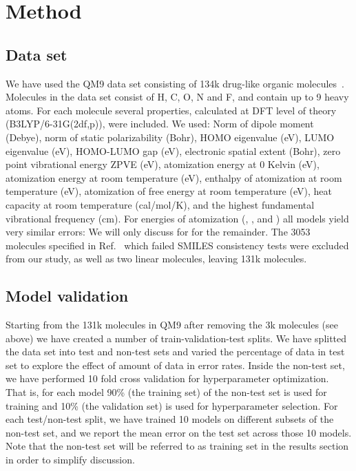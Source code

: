 \documentclass[reprint, superscriptaddress,
amsmath,amssymb, aps, prb,
]{revtex4-1}
\begin{document}
{\section{Method}
\subsection{Data set}

We have used the QM9 data set consisting of 134k drug-like organic molecules~\cite{gdb9}.
Molecules in the data set consist of H, C, O, N and F, and contain up to 9 heavy atoms. 
For each molecule several properties, calculated at DFT level of theory (B3LYP/6-31G(2df,p)), were included. 
We used: Norm of dipole moment  (Debye), norm of static polarizability  (Bohr), HOMO eigenvalue  (eV), LUMO eigenvalue  (eV), HOMO-LUMO gap  (eV), electronic spatial extent  (Bohr), zero point vibrational energy ZPVE (eV), atomization energy at 0 Kelvin  (eV), atomization energy at room temperature  (eV), enthalpy of atomization at room temperature  (eV), atomization of free energy at room temperature  (eV), heat capacity at room temperature  (cal/mol/K), and the highest fundamental vibrational frequency   (cm). 
For energies of atomization (, ,  and ) all models yield very similar errors:
We will only discuss for  for the remainder.
The 3053 molecules specified in Ref.~\cite{gdb9} which failed SMILES consistency tests were excluded from our study, 
as well as two linear molecules, leaving 131k molecules. 

\subsection{Model validation}

Starting from the 131k molecules in QM9 after removing the 3k molecules (see above) we have created a number of train-validation-test splits. 
We have splitted the data set into test and non-test sets and varied the percentage of data in test set to explore the effect of amount of data in error rates.
Inside the non-test set, we have performed 10 fold cross validation for hyperparameter optimization. 
That is, for each model 90\% (the training set) of the non-test set is used for training and 10\% (the validation set) is used for hyperparameter selection.
For each test/non-test split, we have trained 10 models on different subsets of the non-test set, and we report the mean error on the test set across those 10 models. 
Note that the non-test set will be referred to as training set in the results section in order to simplify discussion.

}
\end{document}
